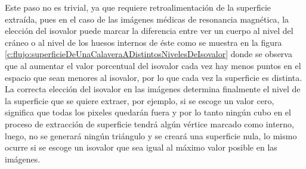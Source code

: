 Este paso no es trivial, ya que requiere retroalimentación de la superficie extraída, pues en el caso de las imágenes médicas de resonancia magnética, la elección del isovalor puede marcar la diferencia entre ver un cuerpo al nivel del cráneo o al nivel de los huesos internos de éste como se muestra en la figura \ref{c:flujo:superficieDeUnaCalaveraADistintosNivelesDeIsovalor} donde se observa que al aumentar el valor porcentual del isovalor cada vez hay menos puntos en el espacio que sean menores al isovalor, por lo que cada vez la superficie es distinta. La correcta elección del isovalor en las imágenes determina finalmente el nivel de la superficie que se quiere extraer, por ejemplo, si se escoge un valor cero, significa que todas los pixeles quedarán fuera y por lo tanto ningún cubo en el proceso de extracción de superficie tendrá algún vértice marcado como interno, luego, no se generará ningún triángulo y se creará una superficie nula, lo mismo ocurre si se escoge un isovalor que sea igual al máximo valor posible en las imágenes.



